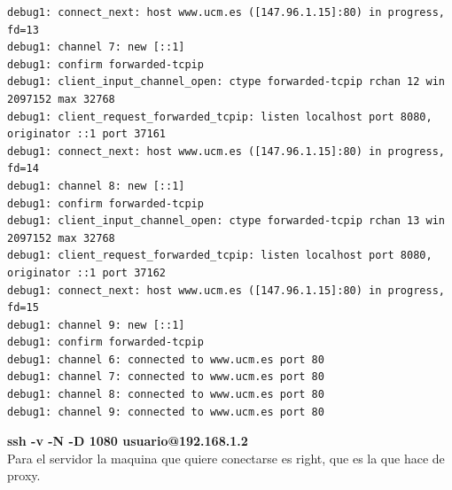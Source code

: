 \documentclass[11pt]{article}
\begin{document}
\begin{lstlisting}
debug1: connect_next: host www.ucm.es ([147.96.1.15]:80) in progress, fd=13
debug1: channel 7: new [::1]
debug1: confirm forwarded-tcpip
debug1: client_input_channel_open: ctype forwarded-tcpip rchan 12 win 2097152 max 32768
debug1: client_request_forwarded_tcpip: listen localhost port 8080, originator ::1 port 37161
debug1: connect_next: host www.ucm.es ([147.96.1.15]:80) in progress, fd=14
debug1: channel 8: new [::1]
debug1: confirm forwarded-tcpip
debug1: client_input_channel_open: ctype forwarded-tcpip rchan 13 win 2097152 max 32768
debug1: client_request_forwarded_tcpip: listen localhost port 8080, originator ::1 port 37162
debug1: connect_next: host www.ucm.es ([147.96.1.15]:80) in progress, fd=15
debug1: channel 9: new [::1]
debug1: confirm forwarded-tcpip
debug1: channel 6: connected to www.ucm.es port 80
debug1: channel 7: connected to www.ucm.es port 80
debug1: channel 8: connected to www.ucm.es port 80
debug1: channel 9: connected to www.ucm.es port 80
\end{lstlisting}

      \bigskip
      \par
      \textbf{ssh -v -N -D 1080 usuario@192.168.1.2}\\
      Para el servidor la maquina que quiere conectarse es right, que es la que
      hace de proxy.
\end{document}
